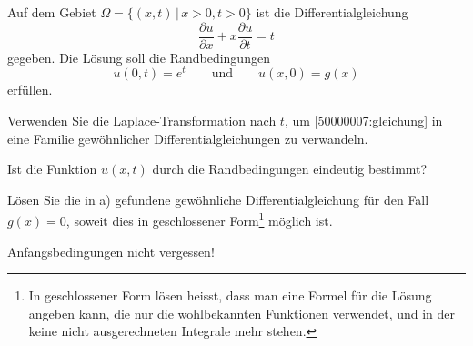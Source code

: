 Auf dem Gebiet $\Omega=\{(x,t)\,|\, x>0,t > 0\}$
ist die Differentialgleichung
\begin{equation}
\frac{\partial u}{\partial x}+x\frac{\partial u}{\partial t}=t
\label{50000007:gleichung}
\end{equation}
gegeben. Die Lösung soll die Randbedingungen
\[
u(0,t)=e^t
\qquad
\text{und}
\qquad
u(x,0)=g(x)
\]
erfüllen.
\begin{teilaufgaben}
\item Verwenden Sie die Laplace-Transformation nach $t$,
um \eqref{50000007:gleichung} in eine Familie gewöhnlicher
Differentialgleichungen zu verwandeln.
\item
Ist die Funktion $u(x,t)$ durch die Randbedingungen eindeutig bestimmt?
\item
Lösen Sie die in a) gefundene gewöhnliche Differentialgleichung für den Fall
$g(x)=0$, soweit dies in geschlossener Form\footnote{In geschlossener Form
lösen heisst, dass man eine Formel für die Lösung angeben kann, die 
nur die wohlbekannten Funktionen verwendet, und in der keine nicht
ausgerechneten Integrale mehr stehen.
} möglich ist.
\end{teilaufgaben}

\begin{hinweis}
Anfangsbedingungen nicht vergessen!
\end{hinweis}

